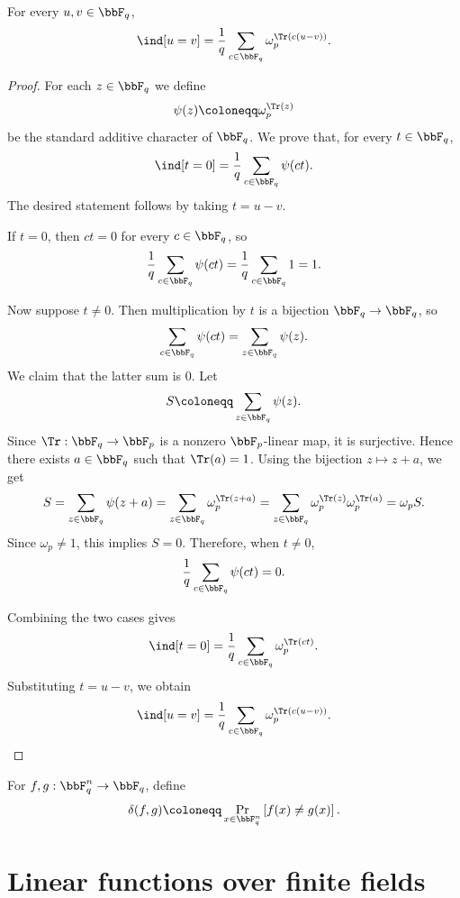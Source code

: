 \begin{lemma}
\label{lem:character-sum-indicator}
\leanok
For every $u,v\in\bbF_q$,
\[
    \ind[u=v]
    = \frac{1}{q}\sum_{c\in\bbF_q}\omega_p^{\Tr(c(u-v))}.
\]
\end{lemma}
\begin{proof}\leanok
For each $z \in \bbF_q$ we define
\[
    \psi(z) \coloneqq \omega_p^{\Tr(z)}
\]
be the standard additive character of \(\bbF_q\). We prove that, for every
\(t\in \bbF_q\),
\[
    \ind[t=0]
    =
    \frac{1}{q}\sum_{c\in\bbF_q}\psi(ct).
\]
The desired statement follows by taking \(t=u-v\).

If \(t=0\), then \(ct=0\) for every \(c\in\bbF_q\), so
\[
    \frac{1}{q}\sum_{c\in\bbF_q}\psi(ct)
    =
    \frac{1}{q}\sum_{c\in\bbF_q}1
    =
    1.
\]

Now suppose \(t\neq 0\). Then multiplication by \(t\) is a bijection
\(\bbF_q\to\bbF_q\), so
\[
    \sum_{c\in\bbF_q}\psi(ct)
    =
    \sum_{z\in\bbF_q}\psi(z).
\]
We claim that the latter sum is \(0\). Let
\[
    S \coloneqq \sum_{z\in\bbF_q}\psi(z).
\]
Since \(\Tr:\bbF_q\to\bbF_p\) is a nonzero \(\bbF_p\)-linear map, it is
surjective. Hence there exists \(a\in\bbF_q\) such that \(\Tr(a)=1\).
Using the bijection \(z\mapsto z+a\), we get
\[
    S
    =
    \sum_{z\in\bbF_q}\psi(z+a)
    =
    \sum_{z\in\bbF_q}\omega_p^{\Tr(z+a)}
    =
    \sum_{z\in\bbF_q}\omega_p^{\Tr(z)}\omega_p^{\Tr(a)}
    =
    \omega_p S.
\]
Since \(\omega_p\neq 1\), this implies \(S=0\). Therefore, when
\(t\neq 0\),
\[
    \frac{1}{q}\sum_{c\in\bbF_q}\psi(ct)=0.
\]

Combining the two cases gives
\[
    \ind[t=0]
    =
    \frac{1}{q}\sum_{c\in\bbF_q}\omega_p^{\Tr(ct)}.
\]
Substituting \(t=u-v\), we obtain
\[
    \ind[u=v]
    =
    \frac{1}{q}\sum_{c\in\bbF_q}\omega_p^{\Tr(c(u-v))}.
\]
\end{proof}

\begin{definition}
\label{def:relative-hamming-distance}
\leanok
For $f,g:\bbF_q^n\to\bbF_q$, define
\[
    \delta(f,g)
    \coloneqq \Pr_{x\in\bbF_q^n}\left[f(x)\ne g(x)\right].
\]
\end{definition}

\section{Linear functions over finite fields}

